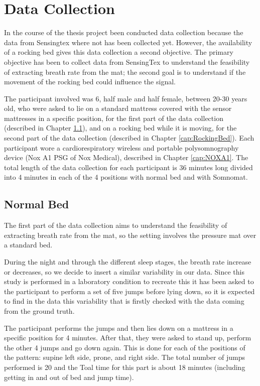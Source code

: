 \section{Data Collection} \label{cap:dataCollection}

In the course of the thesis project been conducted data collection because the data from Sensingtex where not has been collected yet.
However, the availability of a rocking bed gives this data collection a second objective.
The primary objective has been to collect data from SensingTex to understand the feasibility of extracting breath rate from the mat; 
the second goal is to understand if the movement of the rocking bed could influence the signal.

The participant involved was 6, half male and half female, between 20-30 years old, who were asked to lie on a standard mattress covered with the sensor mattresses in a specific position, for the first part of the data collection (described in Chapter \ref{cap:NormalBed}), and on a rocking bed while it is moving, for the second part of the data collection (described in Chapter \ref{cap:RockingBed}).
Each participant wore a cardiorespiratory wireless and portable polysomnography device (Nox A1 PSG of Nox Medical), described in Chapter \ref{cap:NOXA1}. The total length of the data collection for each participant is 36 minutes long divided into 4 minutes in each of the 4 positions with normal bed and with Somnomat.

\subsection{Normal Bed}\label{cap:NormalBed}
The first part of the data collection aims to understand the feasibility of extracting breath rate from the mat, so the setting involves the pressure mat over a standard bed.  

During the night and through the different sleep stages, the breath rate increase or decreases, so we decide to insert a similar variability in our data. Since this study is performed in a laboratory condition to recreate this it has been asked to the participant to perform a set of five jumps before lying down, so it is expected to find in the data this variability that is firstly checked with the data coming from the ground truth.

The participant performs the jumps and then lies down on a mattress in a specific position for 4 minutes.
After that, they were asked to stand up, perform the other 4 jumps and go down again. This is done for each of the positions of the pattern: supine left side, prone, and right side. The total number of jumps performed is 20 and the Toal time for this part is about 18 minutes (including getting in and out of bed and jump time).


